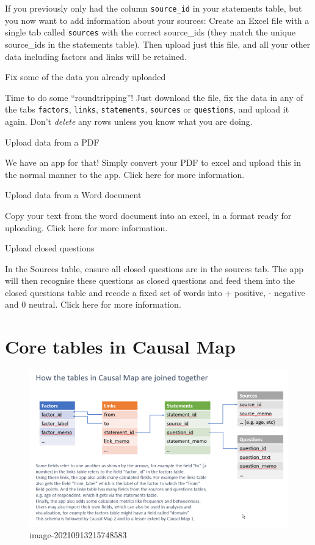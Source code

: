 \documentclass[
]{book}
\begin{document}
If you previously only had the column \texttt{source\_id} in your statements table, but you now want to add information about your sources: Create an Excel file with a single tab called \texttt{sources} with the correct source\_ids (they match the unique source\_ids in the statements table). Then upload just this file, and all your other data including factors and links will be retained.

Fix some of the data you already uploaded

Time to do some ``roundtripping''! Just download the file, fix the data in any of the tabs \texttt{factors}, \texttt{links}, \texttt{statements}, \texttt{sources} or \texttt{questions}, and upload it again. Don't \emph{delete} any rows unless you know what you are doing.

Upload data from a PDF

We have an app for that! Simply convert your PDF to excel and upload this in the normal manner to the app. Click here for more information.

Upload data from a Word document

Copy your text from the word document into an excel, in a format ready for uploading. Click here for more information.

Upload closed questions

In the Sources table, ensure all closed questions are in the sources tab. The app will then recognise these questions as closed questions and feed them into the closed questions table and recode a fixed set of words into + positive, - negative and 0 neutral. Click here for more information.

\hypertarget{core-tables}{%
\chapter{Core tables in Causal Map}\label{core-tables}}

\begin{figure}
\centering
\includegraphics{_assets/image-20210913215748583.png}
\caption{image-20210913215748583}
\end{figure}
\end{document}
